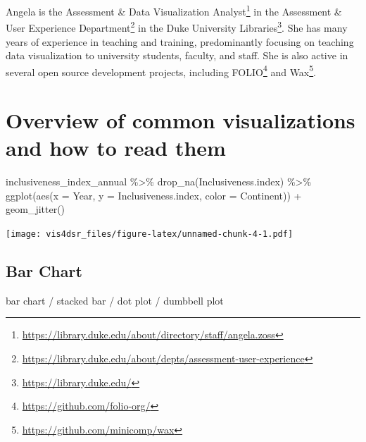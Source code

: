 \documentclass[
]{krantz}
\makeatletter
\newenvironment{Shaded}{\begin{snugshade}}{\end{snugshade}}
\newcommand{\AttributeTok}[1]{\textcolor[rgb]{0.61,0.61,0.61}{#1}}
\newcommand{\FunctionTok}[1]{\textcolor[rgb]{0,0,0}{#1}}
\newcommand{\NormalTok}[1]{#1}
\newcommand{\SpecialCharTok}[1]{\textcolor[rgb]{0,0,0}{#1}}
\renewcommand{\href}[2]{#2\footnote{\url{#1}}}
\newenvironment{kframe}{%
\medskip{}
\setlength{\fboxsep}{.8em}
 \def\at@end@of@kframe{}%
 \ifinner\ifhmode%
  \def\at@end@of@kframe{\end{minipage}}%
  \begin{minipage}{\columnwidth}%
 \fi\fi%
 \def\FrameCommand##1{\hskip\@totalleftmargin \hskip-\fboxsep
 \colorbox{shadecolor}{##1}\hskip-\fboxsep
     \hskip-\linewidth \hskip-\@totalleftmargin \hskip\columnwidth}%
 \MakeFramed {\advance\hsize-\width
   \@totalleftmargin\z@ \linewidth\hsize
   \@setminipage}}%
 {\par\unskip\endMakeFramed%
 \at@end@of@kframe}
\renewenvironment{Shaded}{\begin{kframe}}{\end{kframe}}
\makeatother
\begin{document}
Angela is the \href{https://library.duke.edu/about/directory/staff/angela.zoss}{Assessment \& Data Visualization Analyst} in the \href{https://library.duke.edu/about/depts/assessment-user-experience}{Assessment \& User Experience Department} in the \href{https://library.duke.edu/}{Duke University Libraries}. She has many years of experience in teaching and training, predominantly focusing on teaching data visualization to university students, faculty, and staff. She is also active in several open source development projects, including \href{https://github.com/folio-org/}{FOLIO} and \href{https://github.com/minicomp/wax}{Wax}.

\mainmatter

\hypertarget{reading-visualizations}{%
\chapter{Overview of common visualizations and how to read them}\label{reading-visualizations}}

\begin{Shaded}
\begin{Highlighting}[]
\NormalTok{inclusiveness\_index\_annual }\SpecialCharTok{\%\textgreater{}\%}
  \FunctionTok{drop\_na}\NormalTok{(Inclusiveness.index) }\SpecialCharTok{\%\textgreater{}\%}
  \FunctionTok{ggplot}\NormalTok{(}\FunctionTok{aes}\NormalTok{(}\AttributeTok{x =}\NormalTok{ Year, }\AttributeTok{y =}\NormalTok{ Inclusiveness.index, }\AttributeTok{color =}\NormalTok{ Continent)) }\SpecialCharTok{+}
    \FunctionTok{geom\_jitter}\NormalTok{()}
\end{Highlighting}
\end{Shaded}

\texttt{[image: vis4dsr\_files/figure-latex/unnamed-chunk-4-1.pdf]}

\hypertarget{bar-chart}{%
\section{Bar Chart}\label{bar-chart}}

bar chart / stacked bar / dot plot / dumbbell plot
\end{document}
